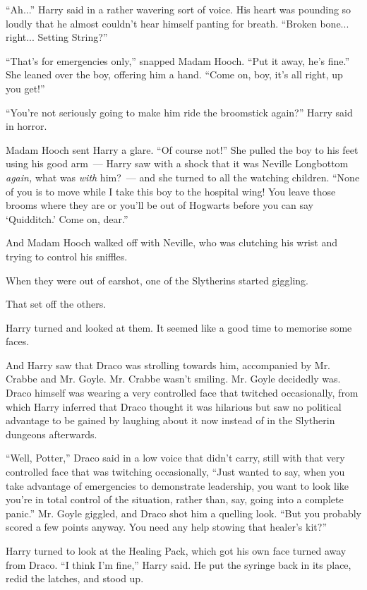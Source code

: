 ``Ah...'' Harry said in a rather wavering sort of voice. His heart was pounding so loudly that he almost couldn't hear himself panting for breath. ``Broken bone... right... Setting String?''

``That's for emergencies only,'' snapped Madam Hooch. ``Put it away, he's fine.'' She leaned over the boy, offering him a hand. ``Come on, boy, it's all right, up you get!''

``You're not seriously going to make him ride the broomstick again?'' Harry said in horror.

Madam Hooch sent Harry a glare. ``Of course not!'' She pulled the boy to his feet using his good arm~--- Harry saw with a shock that it was Neville Longbottom \emph{again,} what was \emph{with} him?~--- and she turned to all the watching children. ``None of you is to move while I take this boy to the hospital wing! You leave those brooms where they are or you'll be out of Hogwarts before you can say `Quidditch.' Come on, dear.''

And Madam Hooch walked off with Neville, who was clutching his wrist and trying to control his sniffles.

When they were out of earshot, one of the Slytherins started giggling.

That set off the others.

Harry turned and looked at them. It seemed like a good time to memorise some faces.

And Harry saw that Draco was strolling towards him, accompanied by Mr. Crabbe and Mr. Goyle. Mr. Crabbe wasn't smiling. Mr. Goyle decidedly was. Draco himself was wearing a very controlled face that twitched occasionally, from which Harry inferred that Draco thought it was hilarious but saw no political advantage to be gained by laughing about it now instead of in the Slytherin dungeons afterwards.

``Well, Potter,'' Draco said in a low voice that didn't carry, still with that very controlled face that was twitching occasionally, ``Just wanted to say, when you take advantage of emergencies to demonstrate leadership, you want to look like you're in total control of the situation, rather than, say, going into a complete panic.'' Mr. Goyle giggled, and Draco shot him a quelling look. ``But you probably scored a few points anyway. You need any help stowing that healer's kit?''

Harry turned to look at the Healing Pack, which got his own face turned away from Draco. ``I think I'm fine,'' Harry said. He put the syringe back in its place, redid the latches, and stood up.

